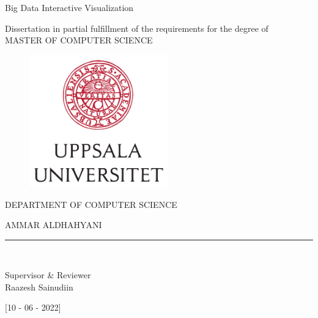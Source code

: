 \documentclass[svgnames]{article}
\begin{document}
\begin{titlepage}
\begin{center}
\vspace*{+3em}
\begin{large}
Big Data Interactive Visualization\\
\end{large}

\vspace*{+4em}
Dissertation in partial fulfillment of the requirements for the degree of\\
\vspace{+2em}
MASTER OF COMPUTER SCIENCE\\

\begin{figure}[htb]
\begin{center}
\includegraphics[width=6cm]{UU_logo.jpg}
\end{center}
\end{figure}

DEPARTMENT OF COMPUTER SCIENCE \\
\vspace*{0.15in}

\vspace*{0.3in}
\begin{large}
AMMAR ALDHAHYANI\\
\end{large}
\vspace*{0.1in}
\rule{80mm}{0.1mm}\\
\vspace*{0.1in}
\begin{large}
Supervisor \& Reviewer \\
Raazesh Sainudiin
\end{large}

\vspace*{+6em}
[10 - 06 - 2022]

\end{center}
\end{titlepage}
\end{document}
